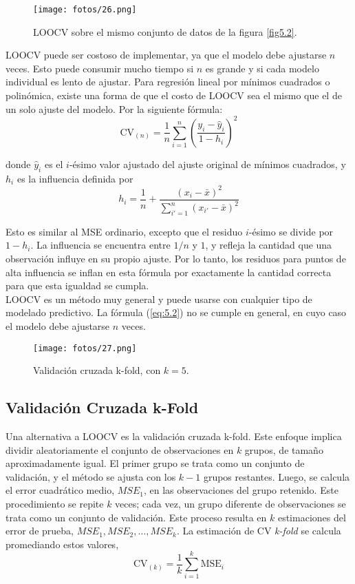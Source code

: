 \begin{figure}[h]
\centering
\texttt{[image: fotos/26.png]}
\caption{LOOCV sobre el mismo conjunto de datos de la figura \ref{fig5.2}.}
\label{fig5.4}
\end{figure}

LOOCV puede ser costoso de implementar, ya que el modelo debe ajustarse $n$ veces. Esto puede consumir mucho tiempo si $n$ es grande y si cada modelo individual es lento de ajustar. Para regresión lineal por mínimos cuadrados o polinómica, existe una forma de que el costo de LOOCV sea el mismo que el de un solo ajuste del modelo. Por la siguiente fórmula:
\begin{equation}
\text{CV}_{(n)} = \frac{1}{n} \sum_{i=1}^{n} \left(\frac{y_i - \hat{y}_i}{1 - h_i}\right)^2
\label{eq:5.2}
\end{equation}

\noindent donde $\hat{y}_i$ es el $i$-ésimo valor ajustado del ajuste original de mínimos cuadrados, y $h_i$ es la influencia definida por
\begin{equation}
h_i = \frac{1}{n} + \frac{(x_i - \bar{x})^2}{\sum_{i'=1}^n (x_{i'} - \bar{x})^2}
\end{equation}

Esto es similar al MSE ordinario, excepto que el residuo $i$-ésimo se divide por $1 - h_i$. La influencia se encuentra entre $1/n$ y $1$, y refleja la cantidad que una observación influye en su propio ajuste. Por lo tanto, los residuos para puntos de alta influencia se inflan en esta fórmula por exactamente la cantidad correcta para que esta igualdad se cumpla. \\

LOOCV es un método muy general y puede usarse con cualquier tipo de modelado predictivo. La fórmula (\ref{eq:5.2}) no se cumple en general, en cuyo caso el modelo debe ajustarse $n$ veces.

\begin{figure}[h]
\centering
\texttt{[image: fotos/27.png]}
\caption{Validación cruzada k-fold, con $k = 5$.}
\label{fig:5.5}
\end{figure}

\subsection{Validación Cruzada k-Fold}

Una alternativa a LOOCV es la validación cruzada k-fold. Este enfoque implica dividir aleatoriamente el conjunto de observaciones en $k$ grupos, de tamaño aproximadamente igual. El primer grupo se trata como un conjunto de validación, y el método se ajusta con los $k-1$ grupos restantes. Luego, se calcula el error cuadrático medio, $MSE_1$, en las observaciones del grupo retenido. Este procedimiento se repite $k$ veces; cada vez, un grupo diferente de observaciones se trata como un conjunto de validación. Este proceso resulta en $k$ estimaciones del error de prueba, $MSE_1, MSE_2, \dots, MSE_k$. La estimación de CV \textit{k-fold} se calcula promediando estos valores,
\begin{equation}
\text{CV}_{(k)} = \frac{1}{k} \sum_{i=1}^{k} \text{MSE}_i
\end{equation}

